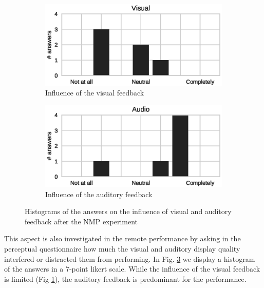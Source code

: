 \begin{figure}[b]
	\centering
\begin{subfigure}[t]{.8\columnwidth}
		\centering        
		\includegraphics[width=\textwidth]{img/Visual}
		\caption{Influence of the visual feedback}
		\label{subfig:visual}
	\end{subfigure}
\begin{subfigure}[t]{.8\columnwidth}
		\centering        
		\includegraphics[width=\textwidth]{img/Audio}
		\caption{Influence of the auditory feedback}
		\label{subfig:audio}
	\end{subfigure}
	\quad 
	\caption{Histograms of the answers on the influence of visual and auditory feedback after the NMP experiment}\label{fig:va}
\end{figure}  

This aspect is also investigated in the remote performance by asking in the perceptual questionnaire how much the visual and auditory display quality interfered or distracted them from performing. In Fig. \ref{fig:va} we display a histogram of the answers in a 7-point likert scale. While the influence of the visual feedback is limited (Fig \ref{subfig:visual}), the auditory feedback is predominant for the performance.

